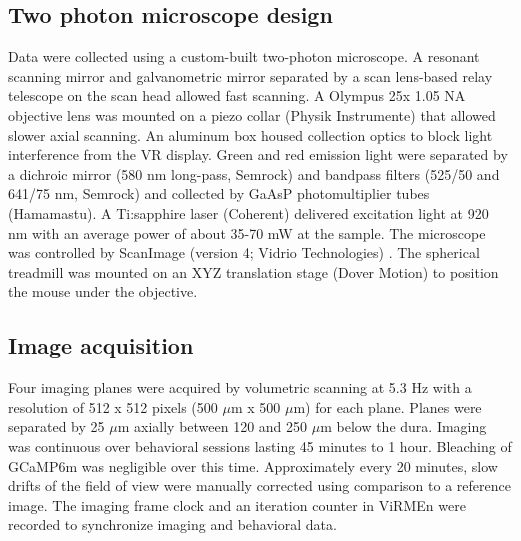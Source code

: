 \subsection{Two photon microscope design} 
Data were collected using a custom-built two-photon microscope. A resonant scanning mirror and galvanometric mirror separated by a scan lens-based relay telescope on the scan head allowed fast scanning. A Olympus 25x 1.05 NA objective lens was mounted on a piezo collar (Physik Instrumente) that allowed slower axial scanning. An aluminum box housed collection optics to block light interference from the VR display. Green and red emission light were separated by a dichroic mirror (580 nm long-pass, Semrock) and bandpass filters (525/50 and 641/75 nm, Semrock) and collected by GaAsP photomultiplier tubes (Hamamastu). A Ti:sapphire laser (Coherent) delivered excitation light at 920 nm with an average power of about 35-70 mW at the sample. The microscope was controlled by ScanImage (version 4; Vidrio Technologies) \citep{Pologruto2003}. The spherical treadmill was mounted on an XYZ translation stage (Dover Motion) to position the mouse under the objective.

\subsection{Image acquisition}
Four imaging planes were acquired by volumetric scanning at 5.3 Hz with a resolution of 512 x 512 pixels (500 $\mu$m x 500 $\mu$m) for each plane. Planes were separated by 25 $\mu$m axially between 120 and 250 $\mu$m below the dura. Imaging was continuous over behavioral sessions lasting 45 minutes to 1 hour. Bleaching of GCaMP6m was negligible over this time. Approximately every 20 minutes, slow drifts of the field of view were manually corrected using comparison to a reference image. The imaging frame clock and an iteration counter in ViRMEn were recorded to synchronize imaging and behavioral data.


